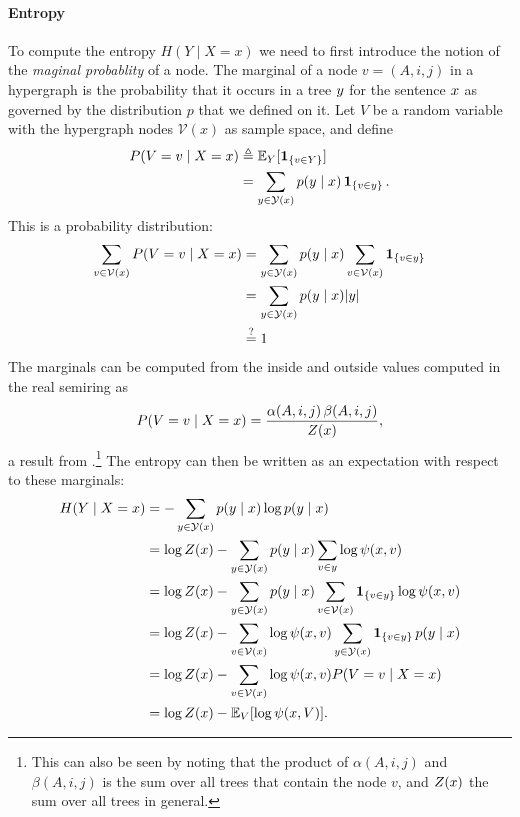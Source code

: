   \paragraph{Entropy}
    To compute the entropy $H(Y \mid X = x)$ we need to first introduce the notion of the \textit{maginal probablity} of a node. The marginal of a node $v = (A, i, j)$ in a hypergraph is the probability that it occurs in a tree $y$ for the sentence $x$ as governed by the distribution $p$ that we defined on it. Let $V$ be a random variable with the hypergraph nodes $\mathcal{V}(x)$ as sample space, and define
    \begin{align}
      P(V = v \mid X = x)
        &\triangleq \operatorname{\mathbb{E}}_Y[ \operatorname{\mathbf{1}}_{ \{ v \in Y \} } ]  \nonumber \\
        &= \sum_{ y \in \mathcal{Y}(x) } p(y \mid x) \operatorname{\mathbf{1}}_{ \{ v \in y \} }.
    \end{align}
    This is a probability distribution:
    \begin{align*}
      \sum_{v \in \mathcal{V}(x)} P(V = v \mid X = x)
        &= \sum_{ y \in \mathcal{Y}(x) } p(y \mid x) \sum_{v \in \mathcal{V}(x)} \operatorname{\mathbf{1}}_{ \{ v \in y \} }  \\
        &= \sum_{ y \in \mathcal{Y}(x) } p(y \mid x) \lvert y \rvert  \\
        &\stackrel{?}{=} 1
    \end{align*}
    The marginals can be computed from the inside and outside values computed in the real semiring as
    \begin{align}
      P(V = v \mid X = x) = \frac{\alpha(A, i, j) \, \beta(A, i, j)}{Z(x)},
    \end{align}
    a result from \citep{goodman1999semiring}.\footnote{This can also be seen by noting that the product of $\alpha(A, i, j)$ and $\beta(A, i, j)$ is the sum over all trees that contain the node $v$, and $Z(x)$ the sum over all trees in general.} The entropy can then be written as an expectation with respect to these marginals:
    \begin{align}
      H(Y \mid X = x)
        &= - \sum_{ y \in \mathcal{Y}(x) } p(y \mid x) \log p(y \mid x)  \nonumber \\
        &= \log Z(x) - \sum_{ y \in \mathcal{Y}(x) } p(y \mid x) \sum_{v \in y} \log \psi(x, v)  \nonumber \\
        &= \log Z(x) - \sum_{ y \in \mathcal{Y}(x) } p(y \mid x) \sum_{ v \in \mathcal{V}(x) } \operatorname{\mathbf{1}}_{ \{ v \in y \} } \log \psi(x, v)  \nonumber \\
        &= \log Z(x) - \sum_{ v \in \mathcal{V}(x) } \log \psi(x, v)  \sum_{ y \in \mathcal{Y}(x) } \operatorname{\mathbf{1}}_{ \{ v \in y \} } p(y \mid x)  \nonumber \\
        &= \log Z(x) - \sum_{ v \in \mathcal{V}(x) } \log \psi(x, v)  P(V = v \mid X = x)  \nonumber \\
        &=  \log Z(x) - \operatorname{\mathbb{E}}_V [ \log \psi(x, V) ].
    \end{align}

